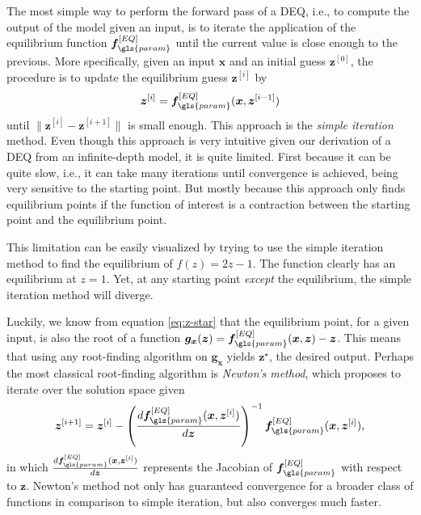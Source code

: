 The most simple way to perform the forward pass of a \gls{DEQ}, i.e., to compute the output of the model given an input, is to iterate the application of the equilibrium function $\bm{f}_{\gls{param}}^{[EQ]}$ until the current value is close enough to the previous.
More specifically, given an input $\bm{x}$ and an initial guess $\bm{z}^{[0]}$, the procedure is to update the equilibrium guess $\bm{z}^{[i]}$ by \[
    \bm{z}^{[i]} = \bm{f}_{\gls{param}}^{[EQ]}(\bm{x}, \bm{z}^{[i-1]})
\] until $\|\bm{z}^{[i]}-\bm{z}^{[i+1]}\|$ is small enough.
This approach is the \emph{simple iteration} method\cite{suli_introduction_2003}.
Even though this approach is very intuitive given our derivation of a \gls{DEQ} from an infinite-depth model, it is quite limited.
First because it can be quite slow, i.e., it can take many iterations until convergence is achieved, being very sensitive to the starting point.
But mostly because this approach only finds equilibrium points if the function of interest is a contraction between the starting point and the equilibrium point\cite{suli_introduction_2003}.

This limitation can be easily visualized by trying to use the simple iteration method to find the equilibrium of $f(z) = 2z-1$.
The function clearly has an equilibrium at $z=1$.
Yet, at any starting point \emph{except} the equilibrium, the simple iteration method will diverge.

Luckily, we know from equation \eqref{eq:z-star} that the equilibrium point, for a given input, is also the root of a function $\bm{g}_{\bm{x}}(\bm{z}) = \bm{f}_{\gls{param}}^{[EQ]}(\bm{x},\bm{z}) - \bm{z}$.
This means that using any root-finding algorithm on $\bm{g}_{\bm{x}}$ yields $\bm{z}^{\star}$, the desired output.
Perhaps the most classical root-finding algorithm is \emph{Newton's method}, which proposes to iterate over the solution space given \[
    \bm{z}^{[i+1]} = \bm{z}^{[i]} - \left( \frac{d \bm{f}_{\gls{param}}^{[EQ]}(\bm{x},\bm{z}^{[i]})}{d\bm{z}} \right)^{-1} \bm{f}_{\gls{param}}^{[EQ]}(\bm{x},\bm{z}^{[i]})
,\] 
in which $\frac{d \bm{f}_{\gls{param}}^{[EQ]}(\bm{x},\bm{z}^{[i]})}{d\bm{z}}$ represents the Jacobian of  $\bm{f}_{\gls{param}}^{[EQ]}$ with respect to $\bm{z}$\footnotemark.
Newton's method not only has guaranteed convergence for a broader class of functions in comparison to simple iteration, but also converges much faster\cite{suli_introduction_2003}.

